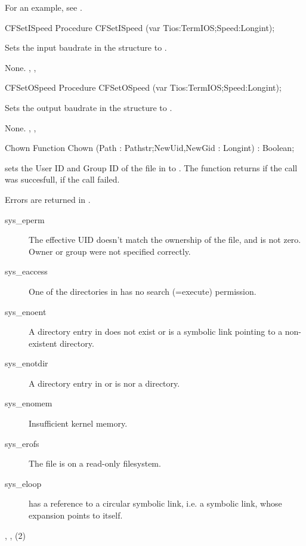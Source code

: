 For an example, see .
\begin{procedure}{CFSetISpeed}
\Declaration
Procedure CFSetISpeed (var Tios:TermIOS;Speed:Longint);

\Description
  Sets the input baudrate in the  structure  to 
  .

\Errors
None.
\SeeAlso
{}, , 
\end{procedure}
\begin{procedure}{CFSetOSpeed}
\Declaration
Procedure CFSetOSpeed (var Tios:TermIOS;Speed:Longint);

\Description
  Sets the output baudrate in the  structure  to
  .

\Errors
None.
\SeeAlso
{}, , 
\end{procedure}
\begin{function}{Chown}
\Declaration
Function Chown (Path : Pathstr;NewUid,NewGid : Longint) : Boolean;

\Description
  sets the User ID and Group ID of the file in  to .
The function returns  if the call was succesfull,  if the call
failed.

\Errors

Errors are returned in .
\begin{description}
\item[sys\_eperm] The effective UID doesn't match the ownership of the file,
and is not zero. Owner or group were not specified correctly.
\item[sys\_eaccess] One of the directories in  has no
search (=execute) permission.
\item[sys\_enoent] A directory entry in  does
not exist or is a symbolic link pointing to a non-existent directory.
\item[sys\_enotdir] A directory entry in  or  is
nor a directory.
\item[sys\_enomem] Insufficient kernel memory.
\item[sys\_erofs] The file is on a read-only filesystem.
\item[sys\_eloop]  has a reference to a circular
symbolic link, i.e. a symbolic link, whose expansion points to itself.
\end{description}

\SeeAlso
{}, , (2)
\end{function}
